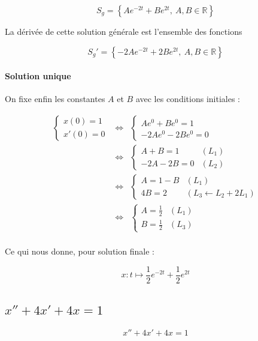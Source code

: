 \documentclass[a4paper, 11pt]{report} %
\newcommand{\R}{\mathbb{R}}
\renewcommand{\mapsto}{\longmapsto}
\begin{document}
\[
S_g = \left\{Ae^{-2t} + Be^{2t},~A,B\in\R\right\}
\]

La dérivée de cette solution générale est l'ensemble des fonctions

\[
S_g' = \left\{-2Ae^{-2t} + 2Be^{2t},~A,B\in\R\right\}
\]

\paragraph{Solution unique}
On fixe enfin les constantes $A$ et $B$ avec les conditions initiales :

\begin{eqnarray*}
\left\{\begin{array}{l}
x(0) = 1\\
x'(0) = 0
\end{array}\right. & \Leftrightarrow &
\left\{\begin{array}{l}
Ae^0 + Be^0 = 1\\
-2Ae^0 - 2Be^0 = 0
\end{array}\right.\\
& \Leftrightarrow &                     %
\left\{\begin{array}{ll}
A + B = 1 & (L_1)\\
-2A - 2B = 0 & (L_2)
\end{array}\right.\\
& \Leftrightarrow &                     %
\left\{\begin{array}{ll}
A = 1 - B & (L_1)\\
4B = 2 & (L_3 \leftarrow L_2 + 2L_1)
\end{array}\right.\\
& \Leftrightarrow &                     %
\left\{\begin{array}{ll}
A = \frac{1}{2} & (L_1)\\
B = \frac{1}{2} & (L_3)
\end{array}\right.\\
\end{eqnarray*}

Ce qui nous donne, pour solution finale :

\[
x : t \mapsto \frac{1}{2}e^{-2t} + \frac{1}{2}e^{2t}
\]
\subsection{$x'' + 4x' + 4x = 1$} %

\begin{equation}
x'' + 4x' + 4x = 1
\label{equa_diff_3}
\end{equation}
\end{document}
